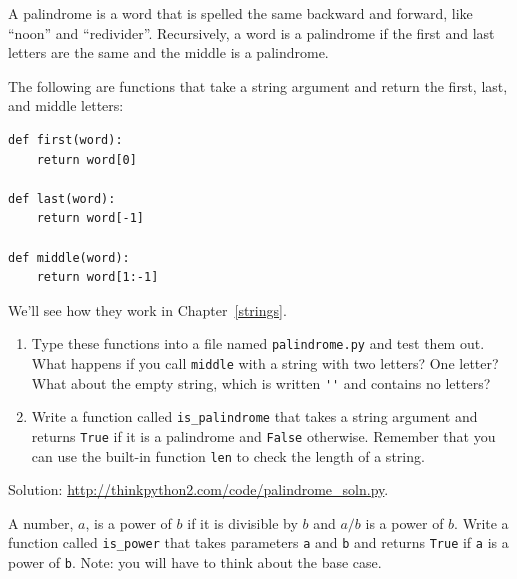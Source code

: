 \documentclass[10pt]{book}
\begin{document}
\begin{exercise}
\label{palindrome}

A palindrome is a word that is spelled the same backward and
forward, like ``noon'' and ``redivider''.  Recursively, a word
is a palindrome if the first and last letters are the same
and the middle is a palindrome.

The following are functions that take a string argument and
return the first, last, and middle letters:

\begin{verbatim}
def first(word):
    return word[0]

def last(word):
    return word[-1]

def middle(word):
    return word[1:-1]
\end{verbatim}
%
We'll see how they work in Chapter~\ref{strings}.

\begin{enumerate}

\item Type these functions into a file named {\tt palindrome.py}
and test them out.  What happens if you call {\tt middle} with
a string with two letters?  One letter?  What about the empty
string, which is written \verb"''" and contains no letters?

\item Write a function called \verb"is_palindrome" that takes
a string argument and returns {\tt True} if it is a palindrome
and {\tt False} otherwise.  Remember that you can use the
built-in function {\tt len} to check the length of a string.

\end{enumerate}

Solution: \url{http://thinkpython2.com/code/palindrome_soln.py}.

\end{exercise}

\begin{exercise}

A number, $a$, is a power of $b$ if it is divisible by $b$
and $a/b$ is a power of $b$.  Write a function called
\verb"is_power" that takes parameters {\tt a} and {\tt b}
and returns {\tt True} if {\tt a} is a power of {\tt b}.
Note: you will have to think about the base case.

\end{exercise}
\end{document}
